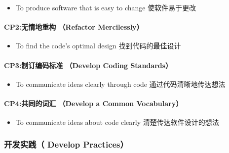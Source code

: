 \begin{itemize}
\tightlist
\item
  To produce software that is easy to change 使软件易于更改
\end{itemize}

\hypertarget{cp2ux65e0ux60c5ux5730ux91cdux6784-refactor-mercilessly}{%
\paragraph{CP2:无情地重构 （Refactor
Mercilessly）}\label{cp2ux65e0ux60c5ux5730ux91cdux6784-refactor-mercilessly}}

\begin{itemize}
\tightlist
\item
  To find the code's optimal design 找到代码的最佳设计
\end{itemize}

\hypertarget{cp3ux5236ux8ba2ux7f16ux7801ux6807ux51c6-develop-coding-standards}{%
\paragraph{CP3:制订编码标准 （Develop Coding
Standards）}\label{cp3ux5236ux8ba2ux7f16ux7801ux6807ux51c6-develop-coding-standards}}

\begin{itemize}
\tightlist
\item
  To communicate ideas clearly through code 通过代码清晰地传达想法
\end{itemize}

\hypertarget{cp4ux5171ux540cux7684ux8bcdux6c47-develop-a-common-vocabulary}{%
\paragraph{CP4:共同的词汇 （Develop a Common
Vocabulary）}\label{cp4ux5171ux540cux7684ux8bcdux6c47-develop-a-common-vocabulary}}

\begin{itemize}
\tightlist
\item
  To communicate ideas about code clearly 清楚传达软件设计的想法
\end{itemize}

\hypertarget{ux5f00ux53d1ux5b9eux8df5-develop-practices}{%
\subsubsection{开发实践（ Develop
Practices）}\label{ux5f00ux53d1ux5b9eux8df5-develop-practices}}

